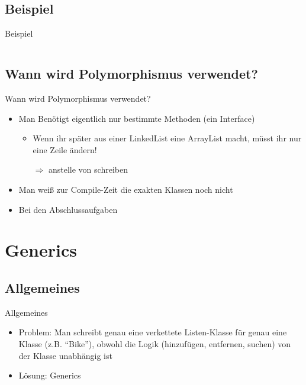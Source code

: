\documentclass[usepdftitle=false,hyperref={pdfpagelabels=false}]{beamer}
\begin{document}
\subsection{Beispiel}
\begin{frame}{Beispiel}
    \inputminted[linenos=true, numbersep=5pt, tabsize=4, fontsize=\small]{java}{LateBinding.java}
\end{frame}

\subsection{Wann wird Polymorphismus verwendet?}
\begin{frame}{Wann wird Polymorphismus verwendet?}
    \begin{itemize}[<+->]
        \item Man Benötigt eigentlich nur bestimmte Methoden (ein Interface)
              \begin{itemize}[<+->]
                \item Wenn ihr später aus einer LinkedList eine ArrayList macht, müsst ihr nur eine Zeile ändern!
                \item[$\Rightarrow$]  anstelle von  schreiben
              \end{itemize}
        \item Man weiß zur Compile-Zeit die exakten Klassen noch nicht
        \item Bei den Abschlussaufgaben
    \end{itemize}
\end{frame}

\section{Generics}
\subsection{Allgemeines}
\begin{frame}{Allgemeines}
    \begin{itemize}
        \item Problem: Man schreibt genau eine verkettete Listen-Klasse
              für genau eine Klasse (z.B. "`Bike"'), obwohl
              die Logik (hinzufügen, entfernen, suchen) von der
              Klasse unabhängig ist
        \item Lösung: Generics
    \end{itemize}
\end{frame}
\end{document}
